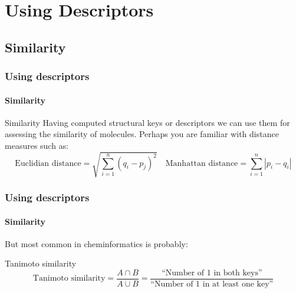 \documentclass[aspectratio=169]{beamer}
\begin{document}
\section{Using Descriptors}

\subsection{Similarity}
    \begin{frame}
        \frametitle{Using descriptors}
        \framesubtitle{Similarity}

        \begin{block}{Similarity}
            Having computed structural keys or descriptors we can use them for assessing the similarity of molecules.
            Perhaps you are familiar with distance measures such as:
            {\small
            \begin{equation*}
                \mbox{Euclidian distance}=\sqrt{\sum^n_{i=1}(q_i-p_j)^2} \quad 
                \mbox{Manhattan distance}=\sum_{i=1}^n{|p_i-q_i|}
            \end{equation*}}
        \end{block}
    \end{frame}


    \begin{frame}
        \frametitle{Using descriptors}
        \framesubtitle{Similarity}
        But most common in cheminformatics is probably:
        \begin{block}{Tanimoto similarity}
            {\small
            \begin{equation*}
            \mbox{Tanimoto similarity}=\frac{A \cap B}{ A \cup B}
                                    =\frac{\text{``Number of 1 in both keys''}}{\text{``Number of 1 in at least one key''}}
            \end{equation*}}
        \end{block}
     \end{frame}
\end{document}

